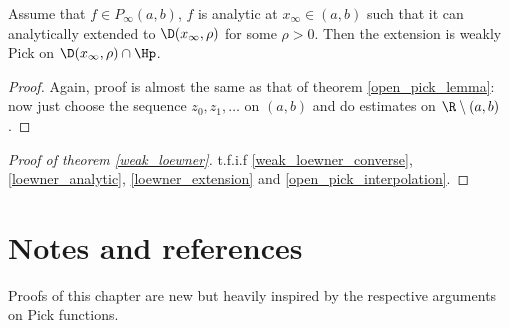 \begin{lem}\label{loewner_extension}
	Assume that $f \in P_{\infty}(a, b)$, $f$ is analytic at $x_{\infty} \in (a, b)$ such that it can analytically extended to $\D(x_{\infty}, \rho)$ for some $\rho > 0$. Then the extension is weakly Pick on $\D(x_{\infty}, \rho) \cap \Hp$.
\end{lem}
\begin{proof}
	Again, proof is almost the same as that of theorem \ref{open_pick_lemma}: now just choose the sequence $z_{0}, z_{1}, \ldots$ on $(a, b)$ and do estimates on $\R \setminus (a, b)$.
\end{proof}

\begin{proof}[Proof of theorem \ref{weak_loewner}]
	t.f.i.f \ref{weak_loewner_converse}, \ref{loewner_analytic}, \ref{loewner_extension} and \ref{open_pick_interpolation}.
\end{proof}

\section{Notes and references}

Proofs of this chapter are new but heavily inspired by the respective arguments on Pick functions.

